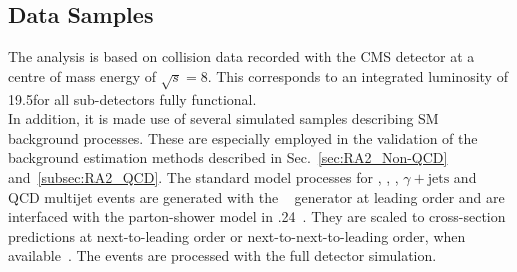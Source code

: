 \subsection{Data Samples}
\label{subsec:RA2_samples_trigger}
The analysis is based on \pp collision data recorded with the CMS detector at a centre of mass energy of $\sqrt{s} = 8$\tev. This corresponds to an integrated luminosity of 19.5\fbinv for all sub-detectors fully functional. \\
In addition, it is made use of several simulated samples describing SM background processes. These are especially employed in the validation of the background estimation methods described in Sec.~\ref{sec:RA2_Non-QCD} and~\ref{subsec:RA2_QCD}. The standard model processes for \ttbar, \WJets, \ZJets, $\gamma + \mathrm{{jets}}$ and QCD multijet events are generated with the \madgraph~\cite{Alwall:2007st} generator at leading order and are interfaced with the parton-shower model in .24~\cite{Sjostrand:2006za}. They are scaled to cross-section predictions at next-to-leading order or next-to-next-to-leading order, when available~\cite{Kidonakis:2010dk, Melnikov:2006kv}. The events are processed with the full detector simulation. 
